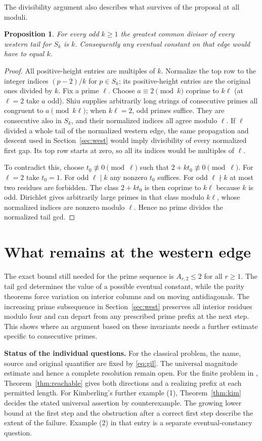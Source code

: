 \documentclass[11pt,a4paper]{article}
\newtheorem{proposition}[theorem]{Proposition}
\begin{document}
The divisibility argument also describes what survives of the proposal at all moduli.
\begin{proposition}
For every odd $k\ge1$ the greatest common divisor of every western tail for $S_k$ is $k$. Consequently any eventual constant on that edge would have to equal $k$.
\end{proposition}
\begin{proof}
All positive-height entries are multiples of $k$. Normalize the top row to the integer indices $(p-2)/k$ for $p\in S_k$; its positive-height entries are the original ones divided by $k$. Fix a prime $\ell$. Choose $a\equiv2\pmod k$ coprime to $k\ell$ (at $\ell=2$ take $a$ odd). Shiu supplies arbitrarily long strings of consecutive primes all congruent to $a\pmod{k\ell}$; when $k\ell=2$, odd primes suffice. They are consecutive also in $S_k$, and their normalized indices all agree modulo $\ell$. If $\ell$ divided a whole tail of the normalized western edge, the same propagation and descent used in Section~\ref{sec:west} would imply divisibility of every normalized first gap. Its top row starts at zero, so all its indices would be multiples of $\ell$.

To contradict this, choose $t_0\not\equiv0\pmod\ell$ such that $2+kt_0\not\equiv0\pmod\ell$. For $\ell=2$ take $t_0=1$. For odd $\ell\mid k$ any nonzero $t_0$ suffices. For odd $\ell\nmid k$ at most two residues are forbidden. The class $2+kt_0$ is then coprime to $k\ell$ because $k$ is odd. Dirichlet gives arbitrarily large primes in that class modulo $k\ell$, whose normalized indices are nonzero modulo $\ell$. Hence no prime divides the normalized tail gcd.
\end{proof}

\section{What remains at the western edge}
The exact bound still needed for the prime sequence is $A_{r,2}\le2$ for all $r\ge1$. The tail gcd determines the value of a possible eventual constant, while the parity theorems force variation on interior columns and on moving antidiagonals. The increasing prime subsequence in Section~\ref{sec:west} preserves all interior residues modulo four and can depart from any prescribed prime prefix at the next step. This shows where an argument based on these invariants needs a further estimate specific to consecutive primes.

\smallskip
\noindent\textbf{Status of the individual questions.}
For the classical problem, the name, source and original quantifier are fixed by \eqref{eq:gil}. The universal magnitude estimate and hence a complete resolution remain open. For the finite problem in \cite{muney,vmwidth}, Theorem~\ref{thm:reachable} gives both directions and a realizing prefix at each permitted length. For Kimberling's further example (1), Theorem~\ref{thm:kim} decides the stated universal assertion by counterexample. The growing lower bound at the first step and the obstruction after a correct first step describe the extent of the failure. Example (2) in that entry is a separate eventual-constancy question.
\end{document}
